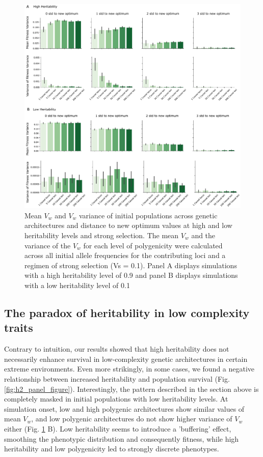 \documentclass{article}
\begin{document}
\begin{figure}[H]
  \centering
  \includegraphics[width=1\textwidth]{figures/mean_var_of_fitness_var_ipop_sel0.1.pdf}
  \caption{Mean $V_w$ and $V_w$ variance of initial populations across genetic architectures and distance to new optimum values at high and low heritability levels and strong selection. The mean $V_w$ and the variance of the $V_w$ for each level of polygenicity were calculated across all initial allele frequencies for the contributing loci and a regimen of strong selection (Vs = 0.1). Panel A displays simulations with a high heritability level of 0.9 and panel B displays simulations with a low heritability level of 0.1}
  \label{fig:initial_pop_meanandvar_fitvar}
\end{figure}

\subsection{The paradox of heritability in low complexity traits}
Contrary to intuition, our results showed that high heritability does not necessarily enhance survival in low-complexity genetic architectures in certain extreme environments. Even more strikingly, in some cases, we found a negative relationship between increased heritability and population survival (Fig. \ref{fig:h2_panel_figure}). Interestingly, the pattern described in the section above is completely masked in initial populations with low heritability levels. At simulation onset, low and high polygenic architectures show similar values of mean $V_w$, and low polygenic architectures do not show higher variance of $V_w$ either (Fig. \ref{fig:initial_pop_meanandvar_fitvar} B). Low heritability seems to introduce a 'buffering' effect, smoothing the phenotypic distribution and consequently fitness, while high heritability and low polygenicity led to strongly discrete phenotypes. 
\end{document}
